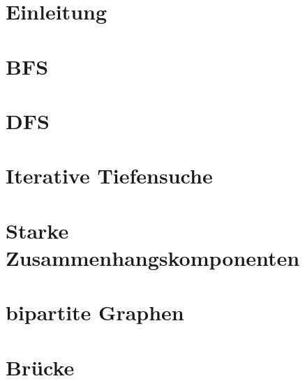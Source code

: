 

\setlength\textheight{7cm} %
	\begin{frame}
		\maketitle
	\end{frame}
	
	\section{Einleitung}
	
	
	\section{BFS}
	
	\section{DFS}
	
	\section{Iterative Tiefensuche}
	
	\section{Starke Zusammenhangskomponenten}
	
	\section{bipartite Graphen}
	
	\section{Brücke}
	
